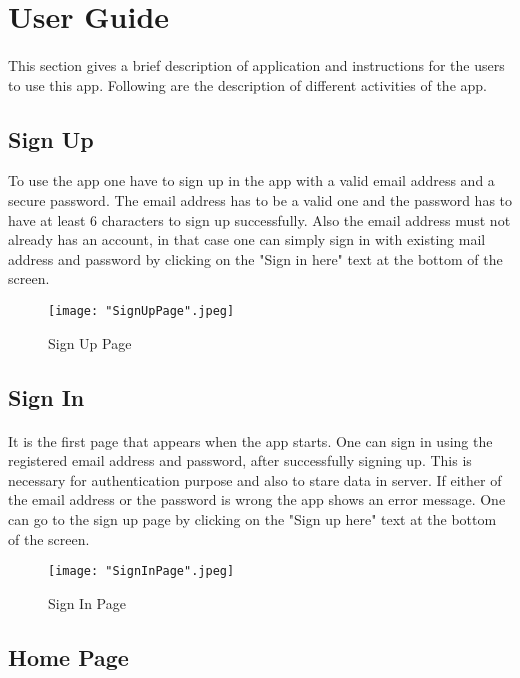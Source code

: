 \documentclass[12pt, a4paper]{article}
\begin{document}
\newpage
\section{User Guide}
\paragraph{}
This section gives a brief description of application and instructions for the users to use this app. Following are the description of different activities of the app.
\subsection{Sign Up}
To use the app one have to sign up in the app with a valid email address and a secure password. The email address has to be a valid one and the password has to have at least 6 characters to sign up successfully. Also the email address must not already has an account, in that case one can simply sign in with existing mail address and password by clicking on the "Sign in here" text at the bottom of the screen.
\begin{figure}[htp]
    \centering
    \texttt{[image: "SignUpPage".jpeg]}
    \caption{Sign Up Page}
\end{figure}
\newpage
\subsection{Sign In}
\paragraph{}
It is the first page that appears when the app starts. One can sign in using the registered email address and password, after successfully signing up. This is necessary for authentication purpose and also to stare data in server. If either of the email address or the password is wrong the app shows an error message. One can go to the sign up page by clicking on the "Sign up here" text at the bottom of the screen. 
\begin{figure}[htp]
    \centering
    \texttt{[image: "SignInPage".jpeg]}
    \caption{Sign In Page}
\end{figure}
\newpage
\subsection{Home Page}
\end{document}
